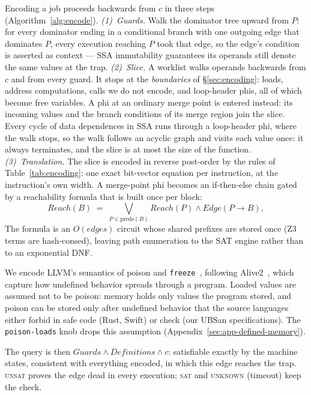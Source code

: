 \documentclass[acmsmall,screen,nonacm]{acmart}
\begin{document}
Encoding a job proceeds backwards from $c$ in three steps
(Algorithm~\ref{alg:encode}).
\emph{(1)~Guards.} Walk the dominator tree upward from $P$: for every
dominator ending in a conditional branch with one outgoing edge that
dominates $P$, every execution reaching $P$ took that edge, so the
edge's condition is asserted as context --- SSA immutability
guarantees its operands still denote the same values at the trap.
\emph{(2)~Slice.} A worklist walks operands backwards from $c$ and
from every guard. It stops at the \emph{boundaries} of
\S\ref{sec:encoding}: loads, address computations, calls we do not
encode, and loop-header phis, all of which become free variables. A
phi at an ordinary merge point is entered instead: its incoming values
and the branch conditions of its merge region join the slice. Every
cycle of data dependences in SSA runs through a loop-header phi, where
the walk stops, so the walk follows an acyclic graph and visits each value
once: it always terminates, and the slice is at most the size of the
function.
\emph{(3)~Translation.} The slice is encoded in reverse post-order by
the rules of Table~\ref{tab:encoding}: one exact bit-vector equation
per instruction, at the instruction's own width. A merge-point phi becomes
an if-then-else chain gated by a reachability formula that is built once per block:
\[
\mathit{Reach}(B) \;=\; \textstyle\bigvee_{P \in \mathrm{preds}(B)}
\mathit{Reach}(P) \wedge \mathit{Edge}(P{\to}B),
\]
The formula is an $O(\mathit{edges})$ circuit whose shared prefixes are stored once
(Z3 terms are hash-consed), leaving path enumeration to the SAT
engine rather than to an exponential DNF.

We encode LLVM's semantics of poison and
\texttt{freeze}~\cite{lee2017taming}, following
Alive2~\cite{lopes2021alive2}, which capture how undefined behavior
spreads through a program. Loaded values are assumed not to be poison: memory holds only values the
program stored, and poison can be stored only after undefined behavior that
the source languages either forbid in safe code (Rust, Swift) or check (our
UBSan specifications). The \texttt{poison-loads} knob drops this assumption
(Appendix~\ref{sec:app-defined-memory}).

The query is then $\mathit{Guards} \wedge \mathit{Definitions} \wedge
c$: satisfiable exactly by the machine states, consistent with
everything encoded, in which this edge reaches the trap.
\textsc{unsat} proves the edge dead in every execution;
\textsc{sat} and \textsc{unknown} (timeout) keep the check.
\end{document}
